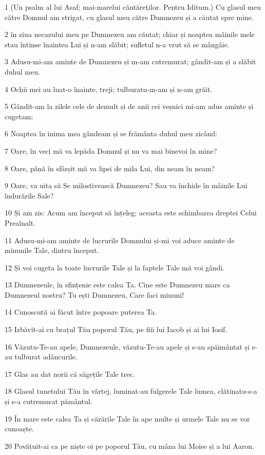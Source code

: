 \par 1 (Un psalm al lui Asaf; mai-marelui cântăreților. Pentru Iditum.) Cu glasul meu către Domnul am strigat, cu glasul meu către Dumnezeu și a căutat spre mine.
\par 2 în ziua necazului meu pe Dumnezeu am căutat; chiar și noaptea mâinile mele stau întinse înaintea Lui și n-am slăbit; sufletul n-a vrut să se mângâie.
\par 3 Adusu-mi-am aminte de Dumnezeu și m-am cutremurat; gândit-am și a slăbit duhul meu.
\par 4 Ochii mei au luat-o înainte, treji; tulburatu-m-am și n-am grăit.
\par 5 Gândit-am la zilele cele de demult și de anii cei veșnici mi-am adus aminte și cugetam;
\par 6 Noaptea în inima mea gândeam și se frământa duhul meu zicând:
\par 7 Oare, în veci mă va lepăda Domnul și nu va mai binevoi în mine?
\par 8 Oare, până în sfârșit mă va lipsi de mila Lui, din neam în neam?
\par 9 Oare, va uita să Se milostivească Dumnezeu? Sau va închide în mâinile Lui îndurările Sale?
\par 10 Și am zis: Acum am început să înțeleg; aceasta este schimbarea dreptei Celui Preaînalt.
\par 11 Adusu-mi-am aminte de lucrurile Domnului și-mi voi aduce aminte de minunile Tale, dintru început.
\par 12 Și voi cugeta la toate lucrurile Tale și la faptele Tale mă voi gândi.
\par 13 Dumnezeule, în sfințenie este calea Ta. Cine este Dumnezeu mare ca Dumnezeul nostru? Tu ești Dumnezeu, Care faci minuni!
\par 14 Cunoscută ai făcut între popoare puterea Ta.
\par 15 Izbăvit-ai cu brațul Tău poporul Tău, pe fiii lui Iacob și ai lui Iosif.
\par 16 Văzutu-Te-au apele, Dumnezeule, văzutu-Te-au apele și s-au spăimântat și s-au tulburat adâncurile.
\par 17 Glas au dat norii că săgețile Tale trec.
\par 18 Glasul tunetului Tău în vârtej, luminat-au fulgerele Tale lumea, clătinatu-s-a și s-a cutremurat pământul.
\par 19 În mare este calea Ta și cărările Tale în ape multe și urmele Tale nu se vor cunoaște.
\par 20 Povățuit-ai ca pe niște oi pe poporul Tău, cu mâna lui Moise și a lui Aaron.

